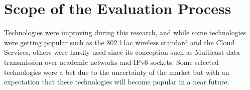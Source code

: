\section{Scope of the Evaluation Process}
\label{sec:scope}

Technologies were improving during this research, and while some technologies were getting popular such as the 802.11ac wireless standard and the Cloud Services, others were hardly used since its conception such as Multicast data transmission over academic networks and IPv6 sockets.
Some selected technologies were a bet due to the uncertainty of the market but with an expectation that these technologies will become popular in a near future.

